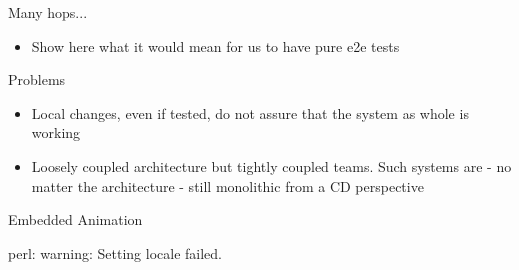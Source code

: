 \begin{frame}{Many hops...}
  \begin{itemize}
    \item Show here what it would mean for us to have pure e2e tests
  \end{itemize}
\end{frame}

\begin{frame}{Problems}
  \begin{itemize}
    [<+->]
    \item Local changes, even if tested, do not assure that the system as whole is working
    \item Loosely coupled architecture but tightly coupled teams. Such systems are - no matter the architecture - still monolithic from a CD perspective
  \end{itemize}
\end{frame}

\begin{frame}{Embedded Animation}
\end{frame}perl: warning: Setting locale failed.
